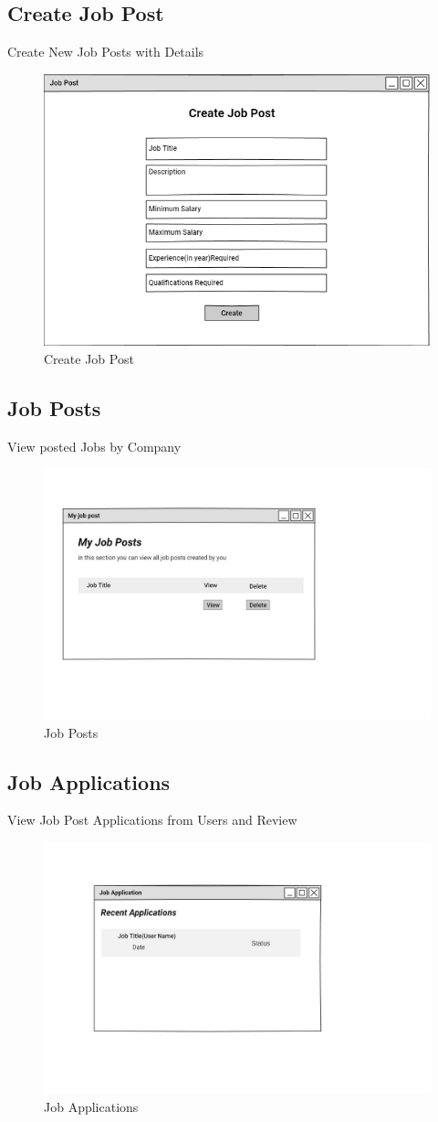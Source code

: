 \documentclass[a4paper,12pt]{report}
\begin{document}
\subsection {Create Job Post}
Create New Job Posts with Details
\begin{figure}[bph]
	\centering
	\includegraphics[width=.6\linewidth]{img/company/createpostjob}
	\caption{Create Job Post}
\end{figure}
\pagebreak
\subsection {Job Posts}
View posted Jobs by Company
\begin{figure}[bph]
	\centering
	\includegraphics[width=.6\linewidth]{img/company/postedjobs}
	\caption{Job Posts}
\end{figure}

\subsection {Job Applications}
View Job Post Applications from Users and Review
\begin{figure}[bph]
	\centering
	\includegraphics[width=.7\linewidth]{img/company/jobapltns}
	\caption{Job Applications}
\end{figure}
\pagebreak
\end{document}
